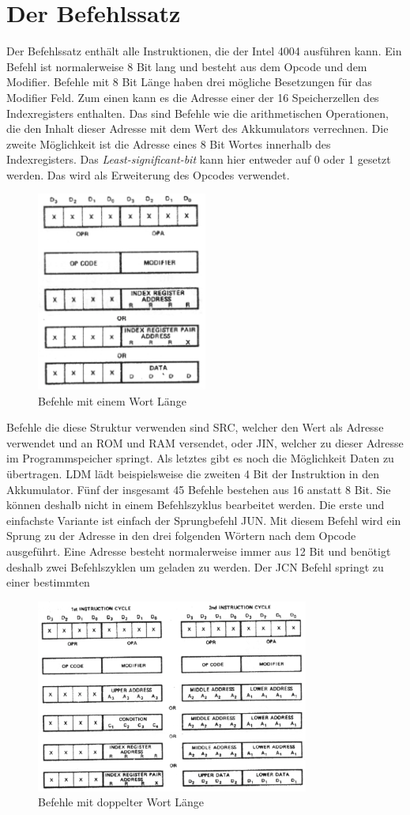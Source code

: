 \section{Der Befehlssatz}
\label{ch:befehlssatz}
Der Befehlssatz enthält alle Instruktionen, die der Intel 4004 ausführen kann. Ein Befehl ist normalerweise 8 Bit lang und besteht aus dem Opcode und dem Modifier. Befehle mit 8 Bit Länge haben drei mögliche Besetzungen für das Modifier Feld. Zum einen kann es die Adresse einer der 16 Speicherzellen des Indexregisters enthalten. Das sind Befehle wie die arithmetischen Operationen, die den Inhalt dieser Adresse mit dem Wert des Akkumulators verrechnen. Die zweite Möglichkeit ist die Adresse eines 8 Bit Wortes innerhalb des Indexregisters. Das \textit{Least-significant-bit} kann hier entweder auf 0 oder 1 gesetzt werden. Das wird als Erweiterung des Opcodes verwendet. 
\begin{figure}[h]
	 	\centering
	 	\includegraphics[width=0.5\textwidth]{figures/instruction_one.png}
	 	\caption{Befehle mit einem Wort Länge}
	 	\label{fig:instructions1}
\end{figure}
Befehle die diese Struktur verwenden sind SRC, welcher den Wert als Adresse verwendet und an ROM und RAM versendet, oder JIN, welcher zu dieser Adresse im Programmspeicher springt. Als letztes gibt es noch die Möglichkeit Daten zu übertragen. LDM lädt beispielsweise die zweiten 4 Bit der Instruktion in den Akkumulator.
Fünf der insgesamt 45 Befehle bestehen aus 16 anstatt 8 Bit. Sie können deshalb nicht in einem Befehlszyklus bearbeitet werden. Die erste und einfachste Variante ist einfach der Sprungbefehl JUN. Mit diesem Befehl wird ein Sprung zu der Adresse in den drei folgenden Wörtern nach dem Opcode ausgeführt. Eine Adresse besteht normalerweise immer aus 12 Bit und benötigt deshalb zwei Befehlszyklen um geladen zu werden. Der JCN Befehl springt zu einer bestimmten 
\begin{figure}
	 	\centering
	 	\includegraphics[width=0.8\textwidth]{figures/instruction_two.png}
	 	\caption{Befehle mit doppelter Wort Länge}
	 	\label{fig:instructions2}
\end{figure}